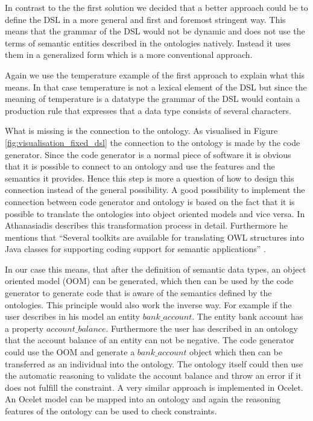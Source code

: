 \par
In contrast to the the first solution we decided that a better approach could be to define the DSL in a more general and first and foremost stringent way. This means that the grammar of the DSL would not be dynamic and does not use the terms of semantic entities described in the ontologies natively. Instead it uses them in a generalized form which is a more conventional approach.
\par
Again we use the temperature example of the first approach to explain what this means. In that case temperature is not a lexical element of the DSL but since the meaning of temperature is a datatype the grammar of the DSL would contain a production rule that expresses that a data type consists of several characters.
\par
What is missing is the connection to the ontology. As visualised in Figure \ref{fig:visualisation_fixed_dsl} the connection to the ontology is made by the code generator. Since the code generator is a normal piece of software it is obvious that it is possible to connect to an ontology and use the features and the semantics it provides. Hence this step is more a question of how to design this connection instead of the general possibility. A good possibility to implement the connection between code generator and ontology is based on the fact that it is possible to translate the ontologies into object oriented models and vice versa. In \autocite{ontology:oom_mapping} Athanasiadis describes this transformation process in detail. Furthermore he mentions that ``Several toolkits are available for translating OWL structures into Java classes for supporting coding support for semantic applications'' \autocite[3]{ontology:oom_mapping}.
\par
 In our case this means, that after the definition of semantic data types, an object oriented model (OOM) can be generated, which then can be used by the code generator to generate code that is aware of the semantics defined by the ontologies. This principle would also work the inverse way. For example if the user describes in his model an entity $bank\_account$. The entity bank account has a property $account\_balance$. Furthermore the user has described in an ontology that the account balance of an entity can not be negative. The code generator could use the OOM and generate a $bank\_account$ object which then can be transferred as an individual into the ontology. The ontology itself could then use the automatic reasoning to validate the account balance and throw an error if it does not fulfill the constraint. A very similar approach is implemented in Ocelet. An Ocelet model can be mapped into an ontology and again the reasoning features of the ontology can be used to check constraints.
